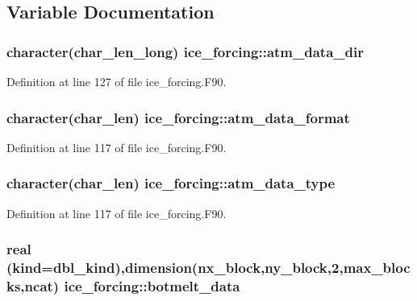 \subsection{Variable Documentation}
\hypertarget{namespaceice__forcing_ade690adebb1115f5b496db9148e05784}{
\subsubsection[{atm\_\-data\_\-dir}]{\setlength{\rightskip}{0pt plus 5cm}character(char\_\-len\_\-long) {\bf ice\_\-forcing::atm\_\-data\_\-dir}}}
\label{namespaceice__forcing_ade690adebb1115f5b496db9148e05784}


Definition at line 127 of file ice\_\-forcing.F90.\hypertarget{namespaceice__forcing_a47d5ef141d5d07f3facede3ccda065b9}{
\subsubsection[{atm\_\-data\_\-format}]{\setlength{\rightskip}{0pt plus 5cm}character(char\_\-len) {\bf ice\_\-forcing::atm\_\-data\_\-format}}}
\label{namespaceice__forcing_a47d5ef141d5d07f3facede3ccda065b9}


Definition at line 117 of file ice\_\-forcing.F90.\hypertarget{namespaceice__forcing_a0a79982d0d62aeee3a33ef50513f3d23}{
\subsubsection[{atm\_\-data\_\-type}]{\setlength{\rightskip}{0pt plus 5cm}character(char\_\-len) {\bf ice\_\-forcing::atm\_\-data\_\-type}}}
\label{namespaceice__forcing_a0a79982d0d62aeee3a33ef50513f3d23}


Definition at line 117 of file ice\_\-forcing.F90.\hypertarget{namespaceice__forcing_a3f2b5aab55a596bdea86fc066fb03fc9}{
\subsubsection[{botmelt\_\-data}]{\setlength{\rightskip}{0pt plus 5cm}real (kind=dbl\_\-kind),dimension(nx\_\-block,ny\_\-block,2,max\_\-blocks,ncat) {\bf ice\_\-forcing::botmelt\_\-data}}}
\label{namespaceice__forcing_a3f2b5aab55a596bdea86fc066fb03fc9}


